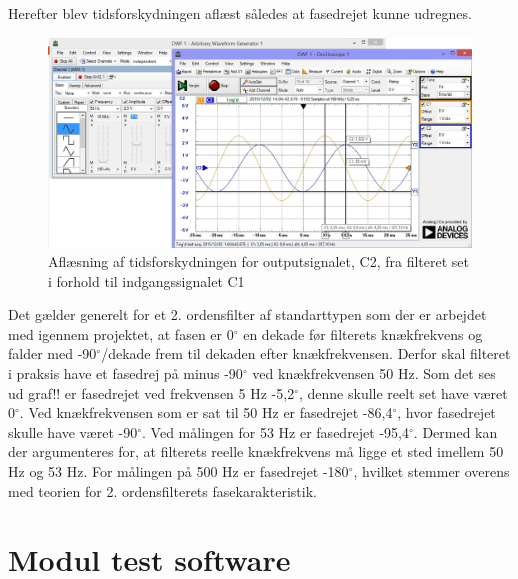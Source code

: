 Herefter blev tidsforskydningen aflæst således at fasedrejet kunne udregnes.

\begin{figure}[H]
	\centering
	\includegraphics[width=1\textwidth]{Figurer/Hardware/AnalogScreenFilter}
	\caption{Aflæsning af tidsforskydningen for outputsignalet, C2, fra filteret set i forhold til indgangssignalet C1}
	\label{fig:FilterTidsforskydning}
\end{figure}

Det gælder generelt for et 2. ordensfilter af standarttypen som der er arbejdet med igennem projektet, at fasen er 0$^{\circ}$ en dekade før filterets knækfrekvens og falder med -90$^{\circ}$/dekade frem til dekaden efter knækfrekvensen. Derfor skal filteret i praksis have et fasedrej på minus -90$^{\circ}$ ved knækfrekvensen 50 Hz. Som det ses ud graf!! er fasedrejet ved frekvensen 5 Hz -5,2$^{\circ}$, denne skulle reelt set have været 0$^{\circ}$. 
Ved knækfrekvensen som er sat til 50 Hz er fasedrejet -86,4$^{\circ}$, hvor fasedrejet skulle have været -90$^{\circ}$. Ved målingen for 53 Hz er fasedrejet -95,4$^{\circ}$. Dermed kan der argumenteres for, at filterets reelle knækfrekvens må ligge et sted imellem 50 Hz og 53 Hz. 
For målingen på 500 Hz er fasedrejet -180$^{\circ}$, hvilket stemmer overens med teorien for 2. ordensfilterets fasekarakteristik.

\section{Modul test software}

